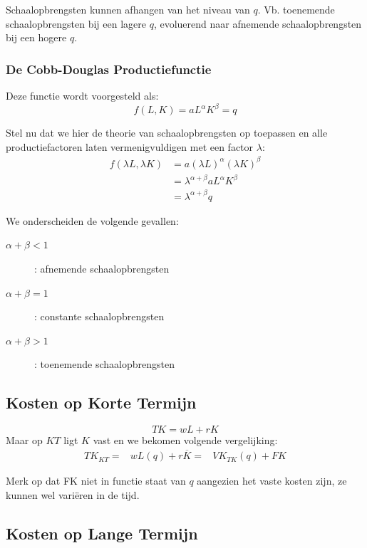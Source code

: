 Schaalopbrengsten kunnen afhangen van het niveau van $q$. Vb. toenemende schaalopbrengsten bij een lagere $q$, evoluerend naar afnemende schaalopbrengsten bij een hogere $q$.

\subsubsection{De Cobb-Douglas Productiefunctie}
Deze functie wordt voorgesteld als:
\begin{equation}
	f(L,K) = a L^\alpha K^\beta = q
\end{equation}

Stel nu dat we hier de theorie van schaalopbrengsten op toepassen en alle productiefactoren laten vermenigvuldigen met een factor $\lambda$:
\begin{align}
	f(\lambda L, \lambda K) &= a (\lambda L)^\alpha (\lambda K)^\beta	\\
	&= \lambda^{\alpha + \beta} a L^\alpha K^\beta	\\
	&= \lambda^{\alpha + \beta} q
\end{align}

We onderscheiden de volgende gevallen:
\begin{description}
	\item[$\alpha + \beta < 1$]: afnemende schaalopbrengsten
	\item[$\alpha + \beta = 1$]: constante schaalopbrengsten
	\item[$\alpha + \beta > 1$]: toenemende schaalopbrengsten
\end{description}



\subsection{Kosten op Korte Termijn}
\begin{equation}
	TK = wL + rK
\end{equation}
Maar op $KT$ ligt $K$ vast en we bekomen volgende vergelijking:
\begin{align}
	TK_{KT} =& w L(q) + r\overline{K}
		=& VK_{TK}(q) + FK
\end{align}

Merk op dat FK niet in functie staat van $q$ aangezien het vaste kosten zijn, ze kunnen wel vari\"eren in de tijd.

\subsection{Kosten op Lange Termijn}